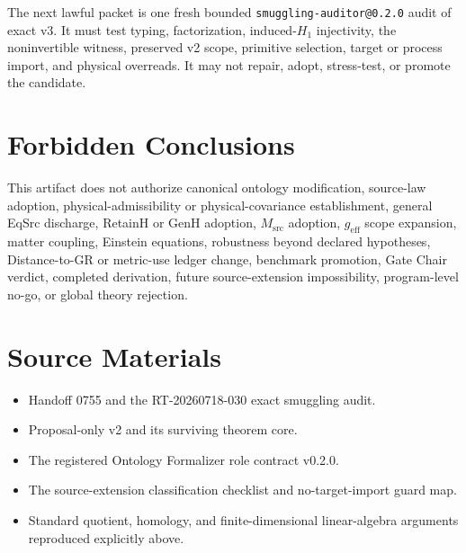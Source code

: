 \documentclass[11pt]{article}
\begin{document}
The next lawful packet is one fresh bounded
\texttt{smuggling-auditor@0.2.0} audit of exact v3. It must test typing,
factorization, induced-\(H_1\) injectivity, the noninvertible witness, preserved
v2 scope, primitive selection, target or process import, and physical
overreads. It may not repair, adopt, stress-test, or promote the candidate.

\section{Forbidden Conclusions}

This artifact does not authorize canonical ontology modification, source-law
adoption, physical-admissibility or physical-covariance establishment,
general EqSrc discharge, RetainH or GenH adoption, \(M_{\mathrm{src}}\)
adoption, \(g_{\mathrm{eff}}\) scope expansion, matter coupling, Einstein
equations, robustness beyond declared hypotheses, Distance-to-GR or
metric-use ledger change, benchmark promotion, Gate Chair verdict, completed
derivation, future source-extension impossibility, program-level no-go, or
global theory rejection.

\section{Source Materials}

\begin{itemize}[leftmargin=*]
  \item Handoff 0755 and the RT-20260718-030 exact smuggling audit.
  \item Proposal-only v2 and its surviving theorem core.
  \item The registered Ontology Formalizer role contract v0.2.0.
  \item The source-extension classification checklist and no-target-import
  guard map.
  \item Standard quotient, homology, and finite-dimensional linear-algebra
  arguments reproduced explicitly above.
\end{itemize}
\end{document}
